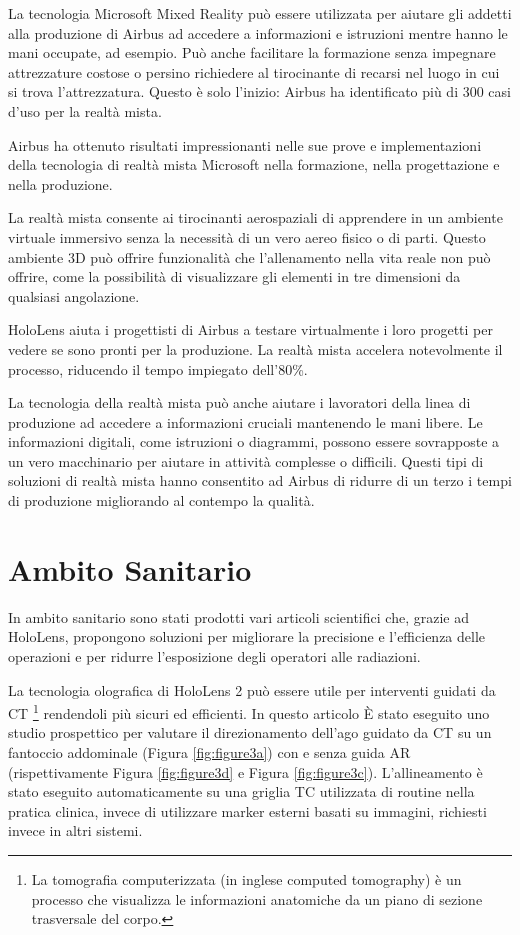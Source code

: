 La tecnologia Microsoft Mixed Reality può essere utilizzata per aiutare gli addetti alla produzione di Airbus ad accedere a informazioni e istruzioni mentre hanno le mani occupate, ad esempio. Può anche facilitare la formazione senza impegnare attrezzature costose o persino richiedere al tirocinante di recarsi nel luogo in cui si trova l'attrezzatura. Questo è solo l'inizio: Airbus ha identificato più di 300 casi d'uso per la realtà mista.

Airbus ha ottenuto risultati impressionanti nelle sue prove e implementazioni della tecnologia di realtà mista Microsoft nella formazione, nella progettazione e nella produzione.

La realtà mista consente ai tirocinanti aerospaziali di apprendere in un ambiente virtuale immersivo senza la necessità di un vero aereo fisico o di parti. Questo ambiente 3D può offrire funzionalità che l'allenamento nella vita reale non può offrire, come la possibilità di visualizzare gli elementi in tre dimensioni da qualsiasi angolazione.

HoloLens aiuta i progettisti di Airbus a testare virtualmente i loro progetti per vedere se sono pronti per la produzione. La realtà mista accelera notevolmente il processo, riducendo il tempo impiegato dell'80\%.

La tecnologia della realtà mista può anche aiutare i lavoratori della linea di produzione ad accedere a informazioni cruciali mantenendo le mani libere. Le informazioni digitali, come istruzioni o diagrammi, possono essere sovrapposte a un vero macchinario per aiutare in attività complesse o difficili. Questi tipi di soluzioni di realtà mista hanno consentito ad Airbus di ridurre di un terzo i tempi di produzione migliorando al contempo la qualità.

\section{Ambito Sanitario}\label{sec:Sezione3.2}
In ambito sanitario sono stati prodotti vari articoli scientifici che, grazie ad HoloLens, propongono soluzioni per migliorare la precisione e l'efficienza delle operazioni e per ridurre l'esposizione degli operatori alle radiazioni.

La tecnologia olografica di HoloLens 2 può essere utile per interventi guidati da CT \footnote{La tomografia computerizzata (in inglese computed tomography) è un processo che visualizza le informazioni anatomiche da un piano di sezione trasversale del corpo.} rendendoli più sicuri ed efficienti.
In questo articolo \cite{Augmented-Reality-Assisted-CT-Guided-Interventions} È stato eseguito uno studio prospettico per valutare il direzionamento dell'ago guidato da CT su un fantoccio addominale (Figura \ref{fig:figure3a}) con e senza guida AR (rispettivamente Figura \ref{fig:figure3d} e Figura \ref{fig:figure3c}). 
L'allineamento è stato eseguito automaticamente su una griglia TC utilizzata di routine nella pratica clinica, invece di utilizzare marker esterni basati su immagini, richiesti invece in altri sistemi.

